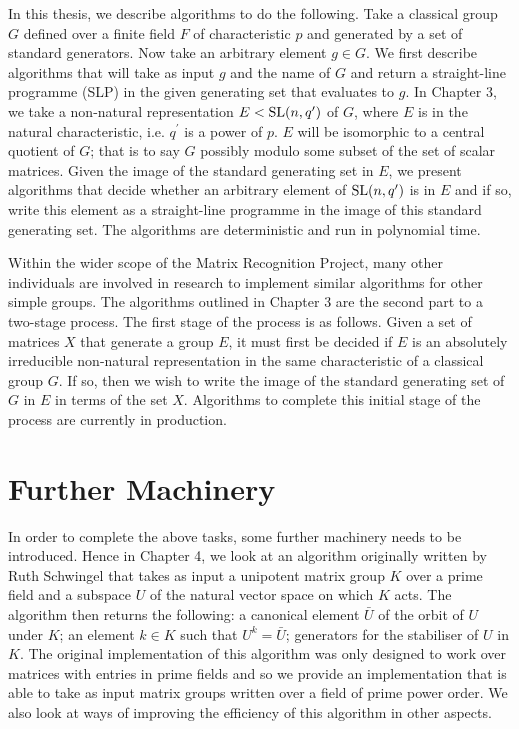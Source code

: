 \documentclass[12pt]{report}
\def\SL{{\rm SL}}
\begin{document}
In this thesis, we describe algorithms to do the following. Take a classical group $G$ defined over a finite field $F$ of characteristic $p$ and generated by a set of standard generators. Now take an arbitrary element $g \in G$. We first describe algorithms that will take as input $g$ and the name of $G$ and return a straight-line programme (SLP) in the given generating set that evaluates to $g$. In Chapter 3, we take a non-natural representation $E < \SL(n, q^\prime)$ of $G$, where $E$ is in the natural characteristic, i.e. $q^\prime$ is a power of $p$. $E$ will be isomorphic to a central quotient of $G$; that is to say $G$ possibly modulo some subset of the set of scalar matrices. Given the image of the standard generating set in $E$, we present algorithms that decide whether an arbitrary element of $\SL(n, q^\prime)$ is in $E$ and if so, write this element as a straight-line programme in the image of this standard generating set. The algorithms are deterministic and run in polynomial time.

Within the wider scope of the Matrix Recognition Project, many other individuals are involved in research to implement similar algorithms for other simple groups. The algorithms outlined in Chapter 3 are the second part to a two-stage process. The first stage of the process is as follows. Given a set of matrices $X$ that generate a group $E$, it must first be decided if $E$ is an absolutely irreducible non-natural representation in the same characteristic of a classical group $G$. If so, then we wish to write the image of the standard generating set of $G$ in $E$ in terms of the set $X$. Algorithms to complete this initial stage of the process are currently in production.

\section{Further Machinery}

In order to complete the above tasks, some further machinery needs to be introduced. Hence in Chapter 4, we look at an algorithm originally written by Ruth Schwingel \cite{Ruth} that takes as input a unipotent matrix group $K$ over a prime field and a subspace $U$ of the natural vector space on which $K$ acts. The algorithm then returns the following: a canonical element $\bar{U}$ of the orbit of $U$ under $K$; an element $k \in K$ such that $U^k = \bar{U}$; generators for the stabiliser of $U$ in $K$. The original implementation of this algorithm was only designed to work over matrices with entries in prime fields and so we provide an implementation that is able to take as input matrix groups written over a field of prime power order. We also look at ways of improving the efficiency of this algorithm in other aspects.
\end{document}
